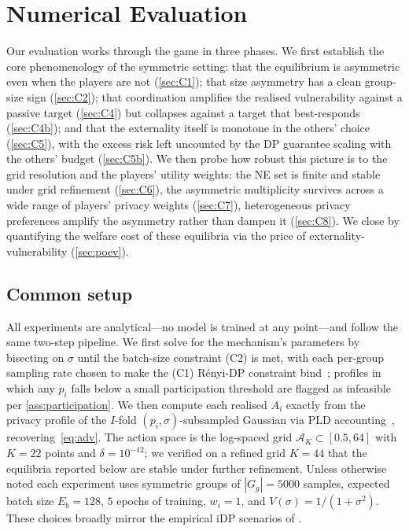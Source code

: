 \section{Numerical Evaluation}
\label{sec:experiments}

Our evaluation works through the game in three phases. We first
establish the core phenomenology of the symmetric setting: that the
equilibrium is asymmetric even when the players are not
(\cref{sec:C1}); that size asymmetry has a clean group-size sign
(\cref{sec:C2}); that coordination amplifies the realised vulnerability
against a passive target (\cref{sec:C4}) but collapses against a target
that best-responds (\cref{sec:C4b}); and that the externality itself is
monotone in the others' choice (\cref{sec:C5}), with the excess risk
left uncounted by the DP guarantee scaling with the others' budget
(\cref{sec:C5b}). We then probe how robust this picture is to the grid
resolution and the players' utility weights: the NE set is finite and
stable under grid refinement (\cref{sec:C6}), the asymmetric
multiplicity survives across a wide range of players' privacy weights
(\cref{sec:C7}), heterogeneous privacy preferences amplify the
asymmetry rather than dampen it (\cref{sec:C8}). We close by
quantifying the welfare cost of these equilibria via the price of
externality-vulnerability (\cref{sec:poev}).

\subsection{Common setup}
\label{sec:setup}

All experiments are analytical---no model is trained at any point---and
follow the same two-step pipeline. We first solve for the mechanism's
parameters by bisecting on $\sigma$ until the batch-size constraint
\textnormal{(C2)} is met, with each per-group sampling rate chosen to make
the \textnormal{(C1)} R\'enyi-DP constraint
bind~\cite{mironov2017renyi}; profiles in which any $p_i$ falls below a
small participation threshold are flagged as infeasible per
\cref{ass:participation}. We then compute each realised $A_i$ exactly from
the privacy profile of the $I$-fold $(p_i, \sigma)$-subsampled Gaussian via
PLD accounting~\cite{google-dp-accounting}, recovering~\eqref{eq:adv}. The
action space is the log-spaced grid $\mathcal{A}_K \subset [0.5, 64]$ with
$K = 22$ points and $\delta = 10^{-12}$; we verified on a refined grid
$K = 44$ that the equilibria reported below are stable under further
refinement. Unless otherwise noted each experiment uses symmetric groups of
$|G_g| = 5000$ samples, expected batch size $E_b = 128$, $5$ epochs of
training, $w_i = 1$, and $V(\sigma) = 1/(1+\sigma^2)$.
These choices broadly mirror the empirical iDP scenarios of
\citet{kaiser2026your, boenisch2023have}.


